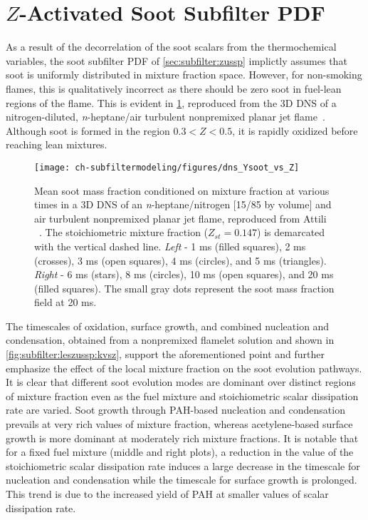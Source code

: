 \section{\texorpdfstring{$Z$}{Z}-Activated Soot Subfilter PDF}
\label{sec:subfilter:zassp}

As a result of the decorrelation of the soot scalars from the thermochemical variables, the soot subfilter PDF of \cref{sec:subfilter:zussp} implictly assumes that soot is uniformly distributed in mixture fraction space. However, for non-smoking flames, this is qualitatively incorrect as there should be zero soot in fuel-lean regions of the flame. This is evident in \cref{fig:subfilter:leszussp:ysvsz}, reproduced from the 3D DNS of a nitrogen-diluted, \textit{n}-heptane/air turbulent nonpremixed planar jet flame~\cite{attili2014}. Although soot is formed in the region $0.3 < Z < 0.5$, it is rapidly oxidized before reaching lean mixtures.

\begin{figure}[htb]
  \centering
  \texttt{[image: ch-subfiltermodeling/figures/dns\_Ysoot\_vs\_Z]}
  \caption[DNS of Turbulent Nonpremixed / Jet Flame, \texorpdfstring{$\langle Y_{\text{s}}|Z \rangle$}{<Ys|Z>} vs. \texorpdfstring{$Z$}{Z}]{Mean soot mass fraction conditioned on mixture fraction at various times in a 3D DNS of an \textit{n}-heptane/nitrogen [15/85 by volume] and air turbulent nonpremixed planar jet flame, reproduced from Attili \etal~\cite{attili2014}. The stoichiometric mixture fraction ($Z_{st} = 0.147$) is demarcated with the vertical dashed line. \textit{Left} - 1 ms (filled squares), 2 ms (crosses), 3 ms (open squares), 4 ms (circles), and 5 ms (triangles). \textit{Right} - 6 ms (stars), 8 ms (circles), 10 ms (open squares), and 20 ms (filled squares). The small gray dots represent the soot mass fraction field at 20 ms.}
  \label{fig:subfilter:leszussp:ysvsz}
\end{figure}

The timescales of oxidation, surface growth, and combined nucleation and condensation, obtained from a nonpremixed flamelet solution and shown in \cref{fig:subfilter:leszussp:kvsz}, support the aforementioned point and further emphasize the effect of the local mixture fraction on the soot evolution pathways. It is clear that different soot evolution modes are dominant over distinct regions of mixture fraction even as the fuel mixture and stoichiometric scalar dissipation rate are varied. Soot growth through PAH-based nucleation and condensation prevails at very rich values of mixture fraction, whereas acetylene-based surface growth is more dominant at moderately rich mixture fractions. It is notable that for a fixed fuel mixture (middle and right plots), a reduction in the value of the stoichiometric scalar dissipation rate induces a large decrease in the timescale for nucleation and condensation while the timescale for surface growth is prolonged. This trend is due to the increased yield of PAH at smaller values of scalar dissipation rate.


